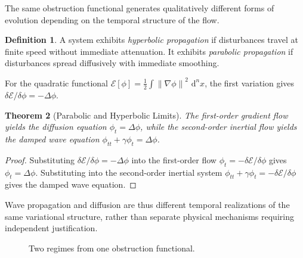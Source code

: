 \documentclass[12pt,a4paper,openany]{book}
\theoremstyle{plain}
\newtheorem{theorem}{Theorem}[chapter]
\theoremstyle{definition}
\newtheorem{definition}[theorem]{Definition}
\theoremstyle{remark}
\newcommand{\norm}[1]{\left\|#1\right\|}
\newcommand{\dvol}{\,\mathrm{d}^n x}
\begin{document}
The same obstruction functional generates qualitatively different forms of evolution depending on the temporal structure of the flow.

\begin{definition}
A system exhibits \emph{hyperbolic propagation} if disturbances travel at finite speed without immediate attenuation. It exhibits \emph{parabolic propagation} if disturbances spread diffusively with immediate smoothing.
\end{definition}

For the quadratic functional $\mathcal{E}[\phi] = \frac{1}{2}\int\norm{\nabla\phi}^2\,\dvol$, the first variation gives $\delta\mathcal{E}/\delta\phi = -\Delta\phi$.

\begin{theorem}[Parabolic and Hyperbolic Limits]
The first-order gradient flow yields the diffusion equation $\phi_t = \Delta\phi$, while the second-order inertial flow yields the damped wave equation $\phi_{tt} + \gamma\phi_t = \Delta\phi$.
\end{theorem}

\begin{proof}
Substituting $\delta\mathcal{E}/\delta\phi = -\Delta\phi$ into the first-order flow $\phi_t = -\delta\mathcal{E}/\delta\phi$ gives $\phi_t = \Delta\phi$. Substituting into the second-order inertial system $\phi_{tt} + \gamma\phi_t = -\delta\mathcal{E}/\delta\phi$ gives the damped wave equation.
\end{proof}

Wave propagation and diffusion are thus different temporal realizations of the same variational structure, rather than separate physical mechanisms requiring independent justification.

\begin{figure}[h]
\centering
{}
\caption[Propagation regimes]{Two regimes from one obstruction functional.}
\label{fig:glyph_regimes}
\end{figure}
\end{document}
